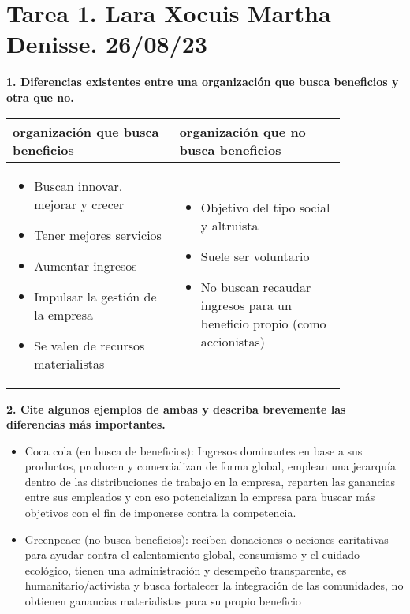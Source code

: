 \documentclass[letterpaper,12pt]{article}
\begin{document}
\begin{sloppypar}
\section*{Tarea 1. Lara Xocuis Martha Denisse. 26/08/23}
\textbf{1. Diferencias existentes entre una organización que busca beneficios y otra que no.}
\begin{table}[H]
    \centering
    \begin{tabular}{|m{0.42\linewidth}|m{0.42\linewidth}|} 
        \hline
        organización que busca beneficios & organización que no busca beneficios\\
        \hline
        \begin{itemize}
            \item Buscan innovar, mejorar y crecer
            \item Tener mejores servicios 
            \item Aumentar ingresos 
            \item Impulsar la gestión de la empresa 
            \item Se valen de recursos materialistas
        \end{itemize}
        & 
        \begin{itemize}
            \item Objetivo del tipo social y altruista 
            \item Suele ser voluntario 
            \item No buscan recaudar ingresos para un beneficio propio (como accionistas)
        \end{itemize} \\ 
        \hline 
    \end{tabular}
\end{table}
\textbf{2. Cite algunos ejemplos de ambas y describa brevemente las diferencias más importantes.}
\begin{itemize}
    \item Coca cola (en busca de beneficios): Ingresos dominantes en base a sus productos, producen y comercializan de forma global, emplean una jerarquía dentro de las distribuciones de trabajo en la empresa, reparten las ganancias entre sus empleados y con eso potencializan la empresa para buscar más objetivos con el fin de imponerse contra la competencia.
    \item Greenpeace (no busca beneficios): reciben donaciones o acciones caritativas para ayudar contra el calentamiento global, consumismo y el cuidado ecológico, tienen una administración y desempeño transparente, es humanitario/activista y busca fortalecer la integración de las comunidades, no obtienen ganancias materialistas para su propio beneficio

\end{itemize}
\end{sloppypar}
\end{document}
